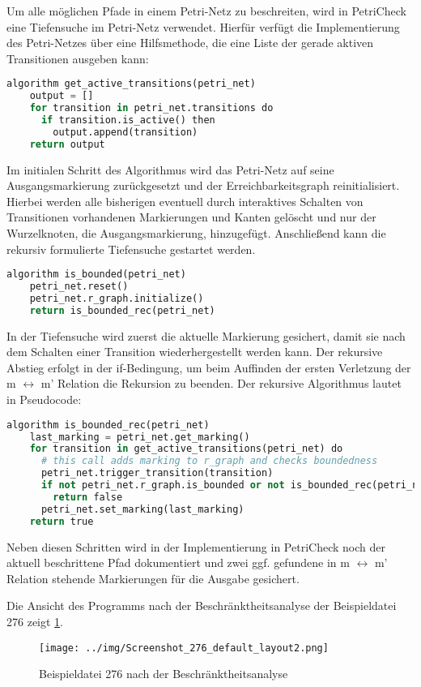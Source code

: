 Um alle möglichen Pfade in einem Petri-Netz zu beschreiten, wird in PetriCheck
eine Tiefensuche im Petri-Netz verwendet. Hierfür verfügt die Implementierung
des Petri-Netzes über eine Hilfsmethode, die eine Liste der gerade aktiven
Transitionen ausgeben kann:

\begin{lstlisting}[language=python, morekeywords={do, algorithm, then}]
  algorithm get_active_transitions(petri_net)
    output = []
    for transition in petri_net.transitions do
      if transition.is_active() then
        output.append(transition)
    return output
\end{lstlisting}

Im initialen Schritt des Algorithmus wird das Petri-Netz auf seine
Ausgangsmarkierung zurückgesetzt und der Erreichbarkeitsgraph reinitialisiert.
Hierbei werden alle bisherigen eventuell durch interaktives Schalten von
Transitionen vorhandenen Markierungen und Kanten gelöscht und nur der
Wurzelknoten, die Ausgangsmarkierung, hinzugefügt. Anschließend kann die rekursiv
formulierte Tiefensuche gestartet werden.

\begin{lstlisting}[language=python, morekeywords={do, algorithm, then}]
  algorithm is_bounded(petri_net)
    petri_net.reset()
    petri_net.r_graph.initialize()
    return is_bounded_rec(petri_net)
\end{lstlisting}

In der Tiefensuche wird zuerst die aktuelle Markierung gesichert, damit sie nach
dem Schalten einer Transition wiederhergestellt werden kann. Der rekursive
Abstieg erfolgt in der if-Bedingung, um beim Auffinden der ersten Verletzung der
m $\leftrightarrow$ m' Relation die Rekursion zu beenden. Der rekursive
Algorithmus lautet in Pseudocode:

\begin{lstlisting}[language=python, morekeywords={do, algorithm, then}]
  algorithm is_bounded_rec(petri_net)
    last_marking = petri_net.get_marking()
    for transition in get_active_transitions(petri_net) do
      # this call adds marking to r_graph and checks boundedness
      petri_net.trigger_transition(transition)
      if not petri_net.r_graph.is_bounded or not is_bounded_rec(petri_net) then
        return false
      petri_net.set_marking(last_marking)
    return true
\end{lstlisting}

Neben diesen Schritten wird in der Implementierung in PetriCheck noch der
aktuell beschrittene Pfad dokumentiert und zwei ggf. gefundene in m
$\leftrightarrow$ m' Relation stehende Markierungen für die Ausgabe gesichert.

Die Ansicht des Programms nach der Beschränktheitsanalyse der Beispieldatei 276 zeigt \cref{img:ex276_default}.

\begin{figure}[H]
  \texttt{[image: ../img/Screenshot\_276\_default\_layout2.png]}
  \caption{Beispieldatei 276 nach der Beschränktheitsanalyse}
  \label{img:ex276_default}
\end{figure}
